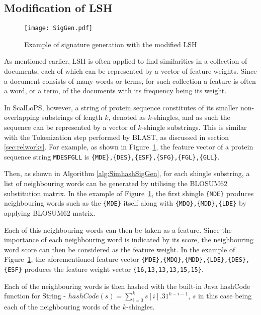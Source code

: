 \documentclass[titlepage]{csetr}
\begin{document}
\subsection{Modification of LSH}

\begin{figure}[t]
\centering
       {\texttt{[image: SigGen.pdf]}}
 \caption{Example of signature generation with the modified LSH}
 \label{fig:SimhashSigGen}
\end{figure}

As mentioned earlier, LSH is often applied to find similarities in a collection of documents, each of which can be represented by a vector of feature weights. Since a document consists of many words or terms, for such collection a feature is often a word, or a term, of the documents with its frequency being its weight.

In ScalLoPS, however, a string of protein sequence constitutes of its smaller non-overlapping substrings of length $k$, denoted as $k$-shingles, and as such the sequence can be represented by a vector of $k$-shingle substrings. This is similar with the Tokenization step performed by BLAST, as discussed in section \ref{sec:relworks}. For example, as shown in Figure~\ref{fig:SimhashSigGen}, the feature vector of a protein sequence string \texttt{MDESFGLL} is \texttt{\{MDE\},\{DES\},\{ESF\},\{SFG\},\{FGL\},\{GLL\}}.

Then, as shown in Algorithm \ref{alg:SimhashSigGen}, for each shingle substring, a list of neighbouring words can be generated by utilising the BLOSUM62 substitution matrix. In the example of Figure~\ref{fig:SimhashSigGen}, the first shingle \texttt{\{MDE\}} produces neighbouring words such as the \texttt{\{MDE\}} itself along with \texttt{\{MDQ\},\{MDD\},\{LDE\}} by applying BLOSUM62 matrix.

Each of this neighbouring words can then be taken as a feature. Since the importance of each neighbouring word is indicated by its score, the neighbouring word score can then be considered as the feature weight. In the example of Figure~\ref{fig:SimhashSigGen}, the aforementioned feature vector \texttt{\{MDE\},\{MDQ\},\{MDD\},\{LDE\},\{DES\},\{ESF\}} produces the feature weight vector \texttt{\{16,13,13,13,15,15\}}.

Each of the neighbouring words is then hashed with the built-in Java hashCode function for String - 
$hashCode(s)=\displaystyle \sum\nolimits_{i=0}^k s[i].31^{k-i-1}$, $s$ in this case being each of the neighbouring words of the $k$-shingles.
\end{document}
